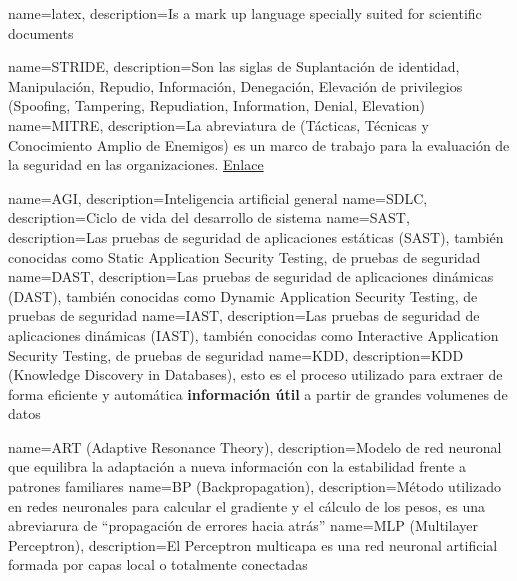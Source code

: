 \makeglossaries


        {name={latex},      description={Is a mark up language specially suited for scientific documents}}

   {name={STRIDE},     description={Son las siglas de Suplantación de identidad, Manipulación, Repudio, Información, Denegación, Elevación de privilegios (Spoofing, Tampering, Repudiation, Information, Denial, Elevation)}}
    {name={MITRE},      description={La abreviatura de (Tácticas, Técnicas y Conocimiento Amplio de Enemigos) es un marco de trabajo para la evaluación de la seguridad en las organizaciones. \href{https://attack.mitre.org/}{Enlace}}}

          {name={AGI},        description={Inteligencia artificial general}}
         {name={SDLC},       description={Ciclo de vida del desarrollo de sistema}}
         {name={SAST},       description={Las pruebas de seguridad de aplicaciones estáticas (SAST), también conocidas como Static Application Security Testing, de pruebas de seguridad}}
         {name={DAST},       description={Las pruebas de seguridad de aplicaciones dinámicas (DAST), también conocidas como Dynamic Application Security Testing, de pruebas de seguridad}}
         {name={IAST},       description={Las pruebas de seguridad de aplicaciones dinámicas (IAST), también conocidas como Interactive Application Security Testing, de pruebas de seguridad}}
          {name={KDD},        description={KDD (Knowledge Discovery in Databases), esto es el proceso utilizado para extraer de forma eficiente y automática \textbf{información útil} a partir de grandes volumenes de datos}}


   {name={ART (Adaptive Resonance Theory)},                description={Modelo de red neuronal que equilibra la adaptación a nueva información con la estabilidad frente a patrones familiares}}
    {name={BP (Backpropagation)},                           description={Método utilizado en redes neuronales para calcular el gradiente y el cálculo de los pesos, es una abreviarura de ``propagación de errores hacia atrás''}}
      {name={MLP (Multilayer Perceptron)},                    description={El Perceptron multicapa es una red neuronal artificial formada por capas local o totalmente conectadas}}

